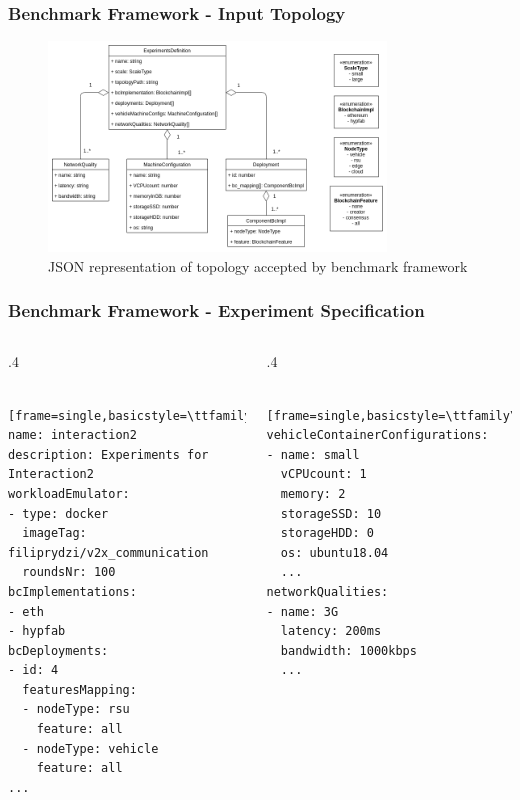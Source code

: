 \documentclass{beamer}
\begin{document}
	\begin{frame}
		\frametitle{Benchmark Framework - Input Topology}
		\begin{figure}
			\centering
			\includegraphics[width=0.8\textwidth]{figures/benchmark_framework_experiment_def.png}
			\vspace{-0.5cm}
			\caption{JSON representation of topology accepted by benchmark framework}
			\label{fig:benchmark_framework_input_topology}
		\end{figure}
	\end{frame}


	\begin{frame}[fragile]
		\frametitle{Benchmark Framework - Experiment Specification}

			\begin{columns}[t]
				\begin{column}{.4\textwidth}
					
					\begin{lstlisting} [frame=single,basicstyle=\ttfamily\scriptsize]
name: interaction2
description: Experiments for Interaction2					
workloadEmulator:
- type: docker
  imageTag: filiprydzi/v2x_communication
  roundsNr: 100					
bcImplementations:
- eth
- hypfab
bcDeployments:
- id: 4
  featuresMapping:
  - nodeType: rsu
    feature: all
  - nodeType: vehicle
    feature: all
...
					\end{lstlisting}
					
				\end{column}
				
				\begin{column}{.4\textwidth}
					
					\begin{lstlisting} [frame=single,basicstyle=\ttfamily\scriptsize,firstnumber=18]
vehicleContainerConfigurations:
- name: small
  vCPUcount: 1
  memory: 2
  storageSSD: 10
  storageHDD: 0
  os: ubuntu18.04
  ...
networkQualities:
- name: 3G
  latency: 200ms
  bandwidth: 1000kbps
  ...
					\end{lstlisting}
					
				\end{column}
			\end{columns}		
	\end{frame}
\end{document}
